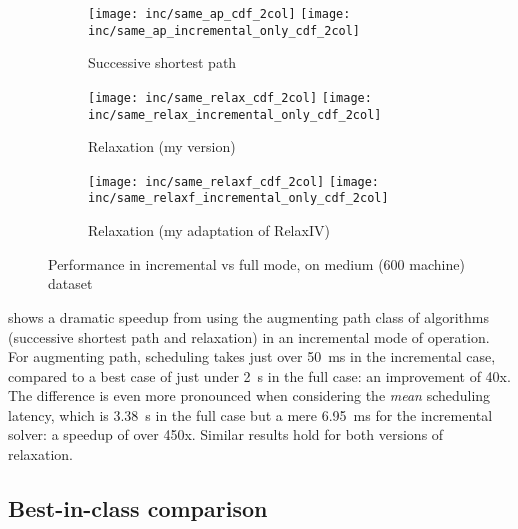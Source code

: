 \begin{figure}
    \begin{widepage}
        \begin{subfigure}[c]{\textwidth}
            \texttt{[image: inc/same\_ap\_cdf\_2col]}
            \texttt{[image: inc/same\_ap\_incremental\_only\_cdf\_2col]}
            \caption{Successive shortest path}
        \end{subfigure}
        \begin{subfigure}[c]{\textwidth}
            \texttt{[image: inc/same\_relax\_cdf\_2col]}                        \texttt{[image: inc/same\_relax\_incremental\_only\_cdf\_2col]}
            \caption{Relaxation (my version)}
        \end{subfigure}
        \begin{subfigure}[c]{\textwidth}
            \texttt{[image: inc/same\_relaxf\_cdf\_2col]}
            \texttt{[image: inc/same\_relaxf\_incremental\_only\_cdf\_2col]}
            \caption{Relaxation (my adaptation of RelaxIV)}
        \end{subfigure}
    \end{widepage}
    \caption{Performance in incremental vs full mode, on medium (600 machine) dataset}
    \label{fig:inc-same}
\end{figure}

 shows a dramatic speedup from using the augmenting path class of algorithms (successive shortest path and relaxation) in an incremental mode of operation. For augmenting path, scheduling takes just over \SI{50}{\milli\second} in the incremental case, compared to a best case of just under \SI{2}{\second} in the full case: an improvement of 40x. The difference is even more pronounced when considering the \emph{mean} scheduling latency, which is \SI{3.38}{\second} in the full case but a mere \SI{6.95}{\milli\second} for the incremental solver: a speedup of over 450x. Similar results hold for both versions of relaxation.


\subsection{Best-in-class comparison}

